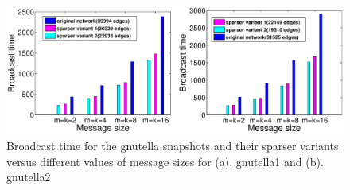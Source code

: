 
\begin{figure}
\centering
\includegraphics[scale=0.25]{./texfiles/Chapter_3/netsci/figs1/gnutella1_gnutella2.eps}
\caption{Broadcast time for the gnutella snapshots and their sparser variants versus different values of message sizes for (a). gnutella1 and (b). gnutella2}
\label{gnutellasparse}
\vspace{.5cm}
\end{figure}
\medskip

 \medskip
